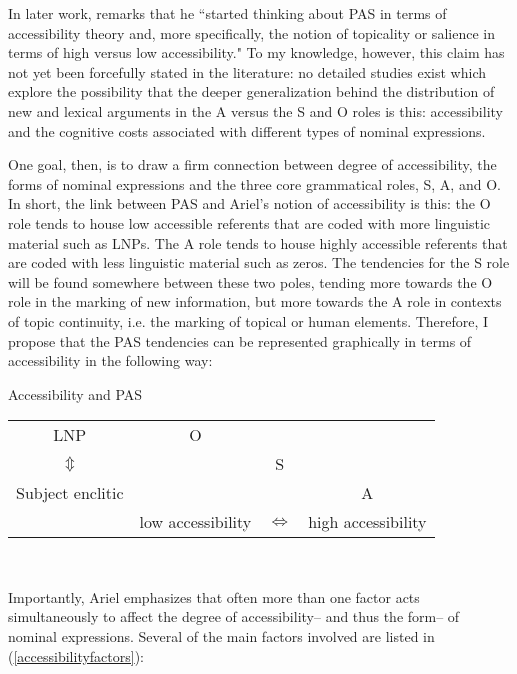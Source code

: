 In later work, \citet[194]{dubois2006} remarks that he ``started thinking about PAS in terms of accessibility theory and, more specifically, the notion of topicality or salience in terms of high versus low accessibility." To my knowledge, however, this claim has not yet been forcefully stated in the literature: no detailed studies exist which explore the possibility that the deeper generalization behind the distribution of new and lexical arguments in the A versus the S and O roles is this: accessibility and the cognitive costs associated with different types of nominal expressions.

One goal, then, is to draw a firm connection between degree of accessibility, the forms of nominal expressions and the three core grammatical roles, S, A, and O. In short, the link between PAS and Ariel's notion of accessibility is this: the O role tends to house low accessible referents that are coded with more linguistic material such as LNPs. The A role tends to house highly accessible referents that are coded with less linguistic material such as zeros. The tendencies for the S role will be found somewhere between these two poles, tending more towards the O role in the marking of new information, but more towards the A role in contexts of topic continuity, i.e. the marking of topical or human elements. Therefore, I propose that the PAS tendencies can be represented graphically in terms of accessibility in the following way: 

\ea\label{graphic} Accessibility and PAS
\begin{center}
\begin{tabular}{| c || c  c  c |}\hline
LNP & O &  & \\

$\Updownarrow$ &  &  S &   \\

Subject enclitic &  &  & A  \\
\hline
\hline
 & low accessibility  &  $\Leftrightarrow$ & high accessibility \\
\hline
\end{tabular}\\
\end{center}
\z

Importantly, Ariel emphasizes that often more than one factor acts simultaneously to affect the degree of accessibility-- and thus the form-- of nominal expressions. Several of the main factors involved are listed in (\ref{accessibilityfactors}): 

